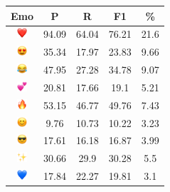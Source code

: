 \documentclass{article}
\begin{document}
\begin{table}
\centering
\begin{tabular}{|c|ccc|c|} \hline
\textbf{Emo} & \textbf{P} & \textbf{R} & \textbf{F1} & \textbf{\%} \\ \hline
\includegraphics[height=0.37cm,width=0.37cm]{img/red_heart.png} & 94.09 & 64.04 & 76.21 & 21.6\\ 
\includegraphics[height=0.37cm,width=0.37cm]{img/smiling_face_with_hearteyes.png} & 35.34 & 17.97 & 23.83 & 9.66\\ 
\includegraphics[height=0.37cm,width=0.37cm]{img/face_with_tears_of_joy.png} & 47.95 & 27.28 & 34.78 & 9.07\\ 
\includegraphics[height=0.37cm,width=0.37cm]{img/two_hearts.png} & 20.81 & 17.66 & 19.1 & 5.21\\ 
\includegraphics[height=0.37cm,width=0.37cm]{img/fire.png} & 53.15 & 46.77 & 49.76 & 7.43\\ 
\includegraphics[height=0.37cm,width=0.37cm]{img/smiling_face_with_smiling_eyes.png} & 9.76 & 10.73 & 10.22 & 3.23\\ 
\includegraphics[height=0.37cm,width=0.37cm]{img/smiling_face_with_sunglasses.png} & 17.61 & 16.18 & 16.87 & 3.99\\ 
\includegraphics[height=0.37cm,width=0.37cm]{img/sparkles.png} & 30.66 & 29.9 & 30.28 & 5.5\\ 
\includegraphics[height=0.37cm,width=0.37cm]{img/blue_heart.png} & 17.84 & 22.27 & 19.81 & 3.1\\ 

\end{tabular}
\end{table}
\end{document}
